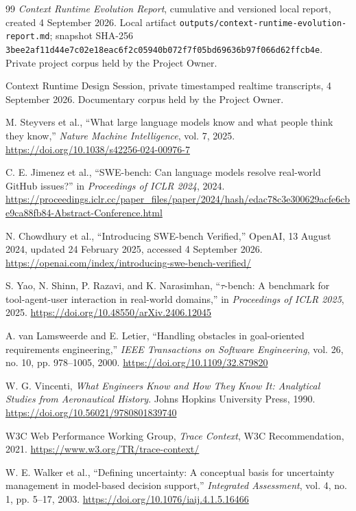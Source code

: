 \documentclass[10pt,a4paper]{article}
\begin{document}
\begin{thebibliography}{99}
\emph{Context Runtime Evolution Report}, cumulative and versioned local report, created 4 September 2026. Local artifact \nolinkurl{outputs/context-runtime-evolution-report.md}; snapshot SHA-256 \nolinkurl{3bee2af11d44e7c02e18eac6f2c05940b072f7f05bd69636b97f066d62ffcb4e}. Private project corpus held by the Project Owner.

Context Runtime Design Session, private timestamped realtime transcripts, 4 September 2026. Documentary corpus held by the Project Owner.

M. Steyvers et al., ``What large language models know and what people think they know,'' \emph{Nature Machine Intelligence}, vol. 7, 2025. \url{https://doi.org/10.1038/s42256-024-00976-7}

C. E. Jimenez et al., ``SWE-bench: Can language models resolve real-world GitHub issues?'' in \emph{Proceedings of ICLR 2024}, 2024. \url{https://proceedings.iclr.cc/paper_files/paper/2024/hash/edac78c3e300629acfe6cbe9ca88fb84-Abstract-Conference.html}

N. Chowdhury et al., ``Introducing SWE-bench Verified,'' OpenAI, 13 August 2024, updated 24 February 2025, accessed 4 September 2026. \url{https://openai.com/index/introducing-swe-bench-verified/}

S. Yao, N. Shinn, P. Razavi, and K. Narasimhan, ``$\tau$-bench: A benchmark for tool-agent-user interaction in real-world domains,'' in \emph{Proceedings of ICLR 2025}, 2025. \url{https://doi.org/10.48550/arXiv.2406.12045}

A. van Lamsweerde and E. Letier, ``Handling obstacles in goal-oriented requirements engineering,'' \emph{IEEE Transactions on Software Engineering}, vol. 26, no. 10, pp. 978--1005, 2000. \url{https://doi.org/10.1109/32.879820}

W. G. Vincenti, \emph{What Engineers Know and How They Know It: Analytical Studies from Aeronautical History}. Johns Hopkins University Press, 1990. \url{https://doi.org/10.56021/9780801839740}

W3C Web Performance Working Group, \emph{Trace Context}, W3C Recommendation, 2021. \url{https://www.w3.org/TR/trace-context/}

W. E. Walker et al., ``Defining uncertainty: A conceptual basis for uncertainty management in model-based decision support,'' \emph{Integrated Assessment}, vol. 4, no. 1, pp. 5--17, 2003. \url{https://doi.org/10.1076/iaij.4.1.5.16466}


\end{thebibliography}
\end{document}
